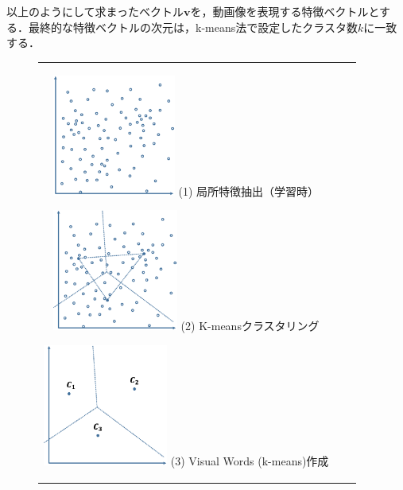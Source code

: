 以上のようにして求まったベクトル$ \bm{v} $を，動画像を表現する特徴ベクトルとする．最終的な特徴ベクトルの次元は，k-means法で設定したクラスタ数$ k $に一致する．
%
\begin{figure}[htbp]
\begin{tabular}{ccc}
%
 \begin{minipage}{0.33\textwidth}
  \begin{center}
   \includegraphics[height=40mm]{figure/bovw_1.eps}
   \hspace{1.6cm} (1) 局所特徴抽出（学習時）
  \end{center}
 \end{minipage}
%
 \begin{minipage}{0.33\textwidth}
  \begin{center}
   \includegraphics[height=40mm]{figure/bovw_2.eps}
   \hspace{1.6cm} (2) K-meansクラスタリング
  \end{center}
 \end{minipage}
%
 \begin{minipage}{0.33\textwidth}
  \begin{center}
   \includegraphics[height=40mm]{figure/bovw_3.eps}
   \hspace{1.6cm} (3) Visual Words (k-means)作成
  \end{center}

\end{minipage}
\end{tabular}
\end{figure}

